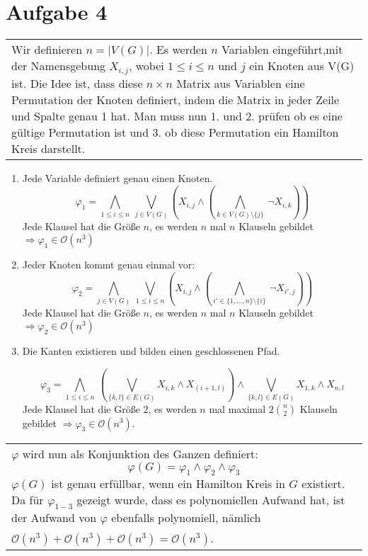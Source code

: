 \documentclass[a4paper,10pt]{article}
\newcommand{\tabspace}{15cm}
\begin{document}
\section*{Aufgabe 4}
\begin{tabular}{@{} p{\tabspace}}
Wir definieren $n = |V(G)|$. Es werden $n$ Variablen eingeführt,mit der Namensgebung $X_{i,j}$, wobei $1 \le i \le n $ und $j$ ein Knoten aus V(G) ist. Die Idee ist, dass diese $n \times n$ Matrix aus Variablen eine Permutation der Knoten definiert, indem die Matrix in jeder Zeile und Spalte genau 1 hat. Man muss nun 1. und 2. prüfen ob es eine gültige Permutation ist und 3. ob diese Permutation ein Hamilton Kreis darstellt.
\end{tabular}
\begin{enumerate}
	\item 	Jede Variable definiert genau einen Knoten.
		\[\varphi_1 = \bigwedge_{1 \le i \le n } ~\bigvee_{j \in {V(G)}} \left( X_{i,j} \land \left( \bigwedge_{k \in V(G)\setminus\{ j\}} ~ \lnot X_{i,k} \right) \right) \]
		Jede Klausel hat die Größe $n$, es werden $n$ mal $n$ Klauseln gebildet $\Rightarrow \varphi_1 \in \mathcal{O}(n^3)$
	\item 	Jeder Knoten kommt genau einmal vor:
		\[\varphi_2 = \bigwedge_{j \in {V(G)}} ~\bigvee_{1 \le i \le n} \left( X_{i,j} \land \left( \bigwedge_{i' \in \{1,...,n\}\setminus\{ i\}} ~ \lnot X_{i',j} \right) \right) \]
		Jede Klausel hat die Größe $n$, es werden $n$ mal $n$ Klauseln gebildet $\Rightarrow \varphi_2 \in \mathcal{O}(n^3)$
	\item  	Die Kanten existieren und bilden einen geschlossenen Pfad.

		\[\varphi_3 = \bigwedge_{1 \le i \le n}~ \left(\bigvee_{\{k,l\} \in E(G)} X_{i,k} \land X_{(i+1,l)} \right) \land \bigvee_{\{k,l\} \in E(G) } X_{1,k} \land X_{n,l}\]
		Jede Klausel hat die Größe $2$, es werden $n$ mal maximal $2\binom{n}{2}$ Klauseln gebildet $\Rightarrow \varphi_3 \in \mathcal{O}(n^3)$.

\end{enumerate}
\begin{tabular}{@{} p{\tabspace}}
$\varphi$ wird nun als Konjunktion des Ganzen definiert: \[\varphi(G) = \varphi_1 \land \varphi_2 \land \varphi_3 \] 
$\varphi(G)$ ist genau erfüllbar, wenn ein Hamilton Kreis in $G$ existiert. Da für $\varphi_{1-3}$ gezeigt wurde, dass es polynomiellen Aufwand hat, ist der Aufwand von $\varphi$ ebenfalls polynomiell, nämlich\\
$\mathcal{O}(n^3) + \mathcal{O}(n^3) + \mathcal{O}(n^3) = \mathcal{O}(n^3)$.

\end{tabular}
\end{document}
